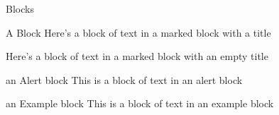 \documentclass{beamer}
\begin{document}
\begin{frame}{Blocks}

	\begin{block}{A Block}
	    Here's a block of text in a marked block with a title
	\end{block}
	
	\begin{block}{}
	    Here's a block of text in a marked block with an empty title
	\end{block}
	
	\begin{alertblock}{an Alert block}
		This is a block of text in an alert block
	\end{alertblock}
	
	\begin{exampleblock}{an Example block}
		This is a block of text in an example block
	\end{exampleblock}
		

\end{frame}
\end{document}
